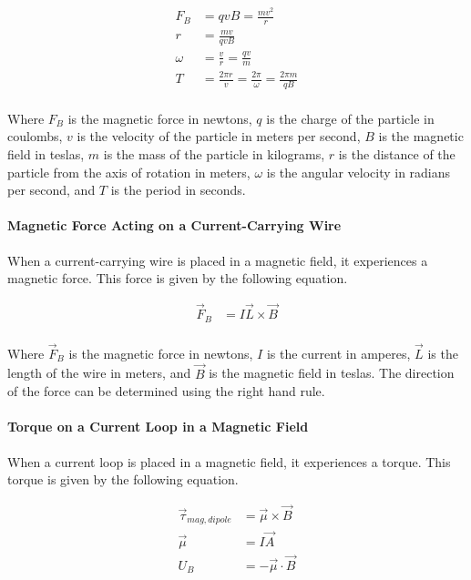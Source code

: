 \begin{align*}
    F_B &= qvB = \frac{mv^2}{r}\\
    r &= \frac{mv}{qvB}\\
    \omega &= \frac{v}{r} = \frac{qv}{m}\\
    T &= \frac{2\pi r}{v} = \frac{2\pi}{\omega} = \frac{2\pi m}{qB}\\
\end{align*}

Where $F_B$ is the magnetic force in newtons, $q$ is the charge of the particle in coulombs, $v$ is the velocity of the 
particle in meters per second, $B$ is the magnetic field in teslas, $m$ is the mass of the particle in kilograms, $r$ is 
the distance of the particle from the axis of rotation in meters, $\omega$ is the angular velocity in radians per second, 
and $T$ is the period in seconds.\\

\paragraph*{Magnetic Force Acting on a Current-Carrying Wire}
When a current-carrying wire is placed in a magnetic field, it experiences a magnetic force. This force is given by the
following equation.

\begin{align*}
    \vec{F}_B &= I\vec{L} \times \vec{B}\\
\end{align*}

Where $\vec{F}_B$ is the magnetic force in newtons, $I$ is the current in amperes, $\vec{L}$ is the length of the wire in meters,
and $\vec{B}$ is the magnetic field in teslas. The direction of the force can be determined using the right hand rule.\\

\paragraph*{Torque on a Current Loop in a Magnetic Field}
When a current loop is placed in a magnetic field, it experiences a torque. This torque is given by the following equation.

\begin{align*}
    \vec{\tau}_{mag,dipole} &= \vec{\mu} \times \vec{B}\\
    \vec{\mu} &= I\vec{A}\\
    U_B &= -\vec{\mu} \cdot \vec{B}\\
\end{align*}

